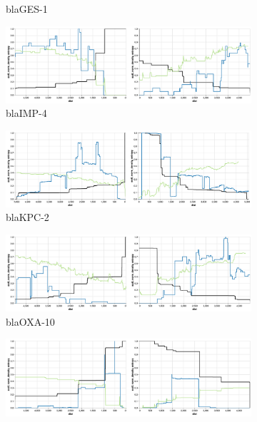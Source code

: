\documentclass[rmp,superscriptaddress,10pt,onecolumn]{revtex4-1}
\begin{document}
\begin{figure}
\begin{subfigure}[b]{0.45\textwidth}
         \caption{blaGES-1}
     \end{subfigure}
          \hfill
     \begin{subfigure}[b]{0.45\textwidth}
         \centering
         \includegraphics[width=\textwidth]{figs_supp/IMP-4.png}
         \caption{blaIMP-4}
     \end{subfigure}
          \hfill
     \begin{subfigure}[b]{0.45\textwidth}
         \centering
         \includegraphics[width=\textwidth]{figs_supp/KPC-2.png}
         \caption{blaKPC-2}
     \end{subfigure}
               \hfill
     \begin{subfigure}[b]{0.45\textwidth}
         \centering
         \includegraphics[width=\textwidth]{figs_supp/OXA-10.png}
         \caption{blaOXA-10}
     \end{subfigure}
               \hfill
     \begin{subfigure}[b]{0.45\textwidth}
         \centering
         \includegraphics[width=\textwidth]{figs_supp/OXA-48.png}

\end{subfigure}
\end{figure}
\end{document}
